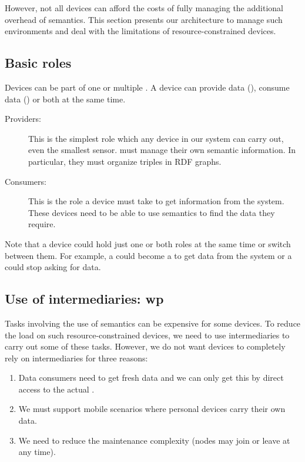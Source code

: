 However, not all devices can afford the costs of fully managing the additional overhead of semantics.
This section presents our architecture to manage such environments and deal with the limitations of resource-constrained devices.

\subsection{Basic roles}
Devices can be part of one or multiple \Spaces{}.
A device can provide data (\providers{}), consume data (\consumers{}) or both at the same time.

\begin{description}
\item[Providers:]
This is the simplest role which any device in our system can carry out, even the smallest sensor.
\providers{} must manage their own semantic information.
In particular, they must organize triples in RDF graphs.
\item[Consumers:]
This is the role a device must take to get information from the system.
These devices need to be able to use semantics to find the data they require.
\end{description}

Note that a device could hold just one or both roles at the same time or switch between them.
For example, a \provider{} could become a \consumer{} to get data from the system or a \consumer{} could stop asking for data.


\subsection{Use of intermediaries: \acl{wp}}
Tasks involving the use of semantics can be expensive for some devices.
To reduce the load on such resource-constrained devices, we need to use intermediaries to carry out some of these tasks.
However, we do not want devices to completely rely on intermediaries for three reasons:
\begin{enumerate}
  \item Data consumers need to get fresh data and we can only get this by direct access to the actual \provider{}.
  \item We must support mobile scenarios where personal devices carry their own data.
  \item We need to reduce the maintenance complexity (nodes may join or leave at any time).
\end{enumerate}


